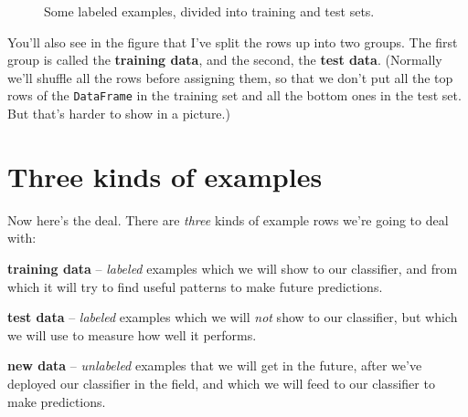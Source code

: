\begin{figure}[ht]
\centering
{}
\smallskip
\caption{Some labeled examples, divided into training and test sets.}
\label{fig:labeledTrainTest}
\end{figure}


You'll also see in the figure that I've split the rows up into two groups. The
first group is called the \textbf{training data}, and the second, the
\textbf{test data}. (Normally we'll shuffle all the rows before assigning them,
so that we don't put all the top rows of the \texttt{DataFrame} in the training
set and all the bottom ones in the test set. But that's harder to show in a
picture.)

\section{Three kinds of examples}

Now here's the deal. There are \textit{three} kinds of example rows we're going
to deal with:

\begin{compactenum}
\item \textbf{training data} -- \textit{labeled} examples which we will show to
our classifier, and from which it will try to find useful patterns to make
future predictions.
\item \textbf{test data} -- \textit{labeled} examples which we will
\textit{not} show to
our classifier, but which we will use to measure how well it performs.
\item \textbf{new data} -- \textit{unlabeled} examples that we will get in the
future, after we've deployed our classifier in the field, and which we will
feed to our classifier to make predictions.
\end{compactenum}

